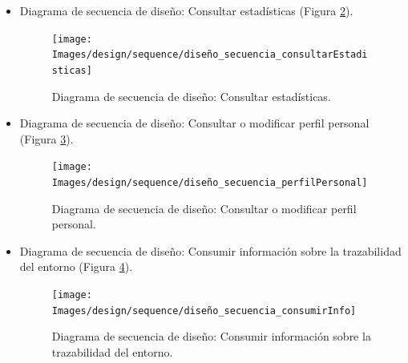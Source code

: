\documentclass[12pt,a4paper, twoside]{report}
\begin{document}
\begin{itemize}
		\begin{figure}[!ht]   
			\caption{Diagrama de secuencia de diseño: Gestionar usuario administrador - Parte 2.} 
			\begin{center} 
	 			\texttt{[image: Images/design/sequence/diseño\_secuencia\_gestionarUsuarioAdministrador\_parte2]} \\
				\label{fig:design_adminuser2} 
			\end{center}  
		\end{figure} 
		
		\newpage
		
		\item Diagrama de secuencia de diseño: Consultar estadísticas (Figura \ref{fig:design_estadisticas}).
		
		\begin{figure}[!ht]   
			\caption{Diagrama de secuencia de diseño: Consultar estadísticas.} 
			\begin{center} 
	 			\texttt{[image: Images/design/sequence/diseño\_secuencia\_consultarEstadisticas]} \\
				\label{fig:design_estadisticas} 
			\end{center}  
		\end{figure} 
		
		\newpage
		
		\item Diagrama de secuencia de diseño: Consultar o modificar perfil personal (Figura \ref{fig:design_perfil}).
		
		\begin{figure}[!ht]   
			\caption{Diagrama de secuencia de diseño: Consultar o modificar perfil personal.} 
			\begin{center} 
	 			\texttt{[image: Images/design/sequence/diseño\_secuencia\_perfilPersonal]} \\
				\label{fig:design_perfil} 
			\end{center}  
		\end{figure} 
		
		\newpage
		
		\item Diagrama de secuencia de diseño: Consumir información sobre la trazabilidad del entorno (Figura \ref{fig:design_consumirInfo}).
		
		\begin{figure}[!ht]   
			\caption{Diagrama de secuencia de diseño: Consumir información sobre la trazabilidad del entorno.} 
			\begin{center} 
	 			\texttt{[image: Images/design/sequence/diseño\_secuencia\_consumirInfo]} \\
				\label{fig:design_consumirInfo} 
			\end{center}  
		\end{figure} 
		
	\end{itemize}
	
\end{document}
